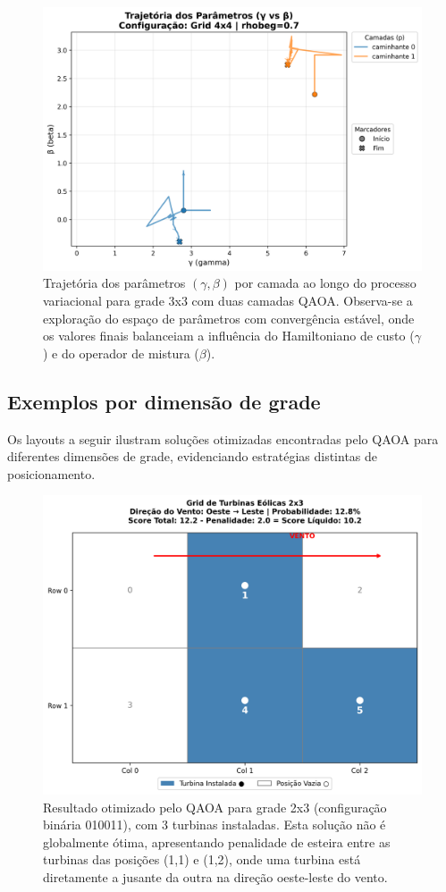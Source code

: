 \documentclass{weciq}
\begin{document}
\begin{figure}[htb]
\centering
\includegraphics[width=0.95\linewidth]{trajetoria.png}
\caption{Trajetória dos parâmetros $(\gamma,\beta)$ por camada ao longo do processo variacional para grade 3x3 com duas camadas QAOA. Observa-se a exploração do espaço de parâmetros com convergência estável, onde os valores finais balanceiam a influência do Hamiltoniano de custo ($\gamma$) e do operador de mistura ($\beta$).}
\end{figure}

\subsection*{Exemplos por dimens\~{a}o de grade}
Os layouts a seguir ilustram soluções otimizadas encontradas pelo QAOA para diferentes dimensões de grade, evidenciando estratégias distintas de posicionamento.

\begin{figure}[htb]
\centering
\includegraphics[width=0.85\linewidth]{grid_visualization_default_2x3_3turbinas_20250810_144135.png}
\caption{Resultado otimizado pelo QAOA para grade 2x3 (configuração binária 010011), com 3 turbinas instaladas. Esta solução não é globalmente ótima, apresentando penalidade de esteira entre as turbinas das posições (1,1) e (1,2), onde uma turbina está diretamente a jusante da outra na direção oeste-leste do vento.}
\end{figure}
\end{document}
